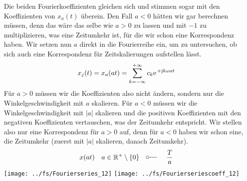 \documentclass[11pt,a4paper,DIV=12]{scrartcl}
\begin{document}
Die beiden Fourierkoeffizienten gleichen sich und stimmen sogar mit den Koeffizienten von $x_{a}(t)$ überein. Den Fall $a<0$ hätten wir gar berechnen müssen, denn das wäre das selbe wie $a>0$ zu lassen und mit $-1$ zu multiplizieren, was eine Zeitumkehr ist, für die wir schon eine Korrespondenz haben. Wir setzen nun $a$ direkt in die Fourierreihe ein, um zu untersuchen, ob sich auch eine Korrespondenz für Zeitskalierungen aufstellen lässt.
\begin{align}
	x_{j}(t)=x_{a}(at)=\sum_{k=-\infty}^{+\infty}c_k\e^{+\im k \omega at}
\end{align}
Für $a>0$ müssen wir die Koeffizienten also nicht ändern, sondern nur die Winkelgeschwindigkeit mit $a$ skalieren. Für $a<0$ müssen wir die Winkelgeschwindigkeit mit $|a|$ skalieren und die positiven Koeffizienten mit den negativen Koeffizienten vertauschen, was der Zeitumkehr entspricht. Wir stellen also nur eine Korrespondenz für $a>0$ auf, denn für $a<0$ haben wir schon eine, die Zeitumkehr (zuerst mit $|a|$ skalieren, danach Zeitumkehr).
\begin{align}
	x(at)\quad a\in\mathbb{R}^+\setminus\{0\}\quad\fourier\quad \frac{T}{a}
\end{align}
\newpage
\texttt{[image: ../fs/Fourierseries\_12]}
\texttt{[image: ../fs/Fourierseriescoeff\_12]}
\newpage
\end{document}
